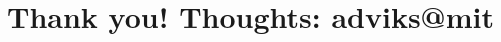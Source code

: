 \documentclass[aspectratio=169]{beamer}
\title{}
\author{Advik Shreekumar}
\date{}
\begin{document}
\maketitle

\section{Thank you! Thoughts: adviks@mit}
\end{document}
